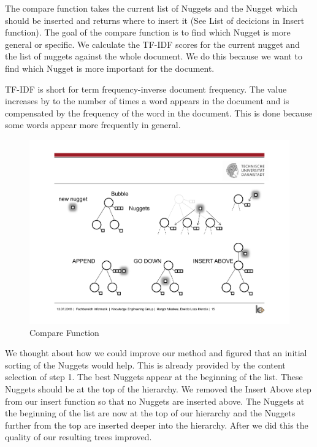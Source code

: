 
The compare function takes the current list of Nuggets and the Nugget which should be inserted and returns where to insert it (See List of decicions in Insert function). The goal of the compare function is to find which Nugget is more general or specific. We calculate the TF-IDF scores for the current nugget and the list of nuggets against the whole document. We do this because we want to find which Nugget is more important for the document.

TF-IDF is short for term frequency-inverse document frequency. The value increases by to the number of times a word appears in the document and is compensated by the frequency of the word in the document. This is done because some words appear more frequently in general. 




\begin{figure}[H]
	\centering
	\includegraphics[trim=22.5cm 12.5cm 2.5cm 5.5cm, clip=true]{img/step2_func.pdf}
	\caption{Compare Function}
	\label{fig:compare}
\end{figure}


We thought about how we could improve our method and figured that an initial sorting of the Nuggets would help. This is already provided by the content selection of step 1. The best Nuggets appear at the beginning of the list. These Nuggets should be at the top of the hierarchy. We removed the Insert Above step from our insert function so that no Nuggets are inserted above. The Nuggets at the beginning of the list are now at the top of our hierarchy and the Nuggets further from the top are inserted deeper into the hierarchy. After we did this the quality of our resulting trees improved.

